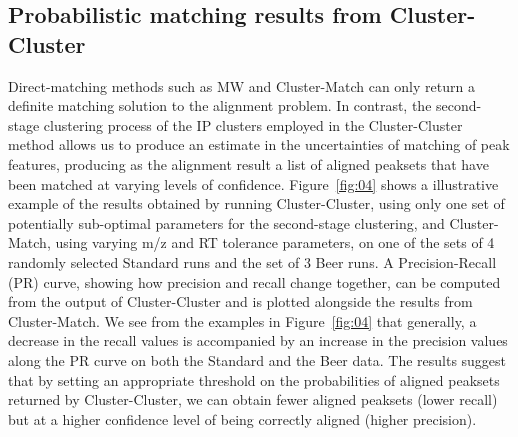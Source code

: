 
\subsection{Probabilistic matching results from Cluster-Cluster}

Direct-matching methods such as MW and Cluster-Match can only return a definite matching solution to the alignment problem. In contrast, the second-stage clustering process of the IP clusters employed in the Cluster-Cluster method allows us to produce an estimate in the uncertainties of matching of peak features, producing as the alignment result a list of aligned peaksets that have been matched at varying levels of confidence. Figure~\ref{fig:04} shows a illustrative example of the results obtained by running Cluster-Cluster, using only one set of potentially sub-optimal parameters for the second-stage clustering, and Cluster-Match, using varying m/z and RT tolerance parameters, on one of the sets of 4 randomly selected Standard runs and the set of 3 Beer runs. A Precision-Recall (PR) curve, showing how precision and recall change together, can be computed from the output of Cluster-Cluster and is plotted alongside the results from Cluster-Match. We see from the examples in Figure~\ref{fig:04} that generally, a decrease in the recall values is accompanied by an increase in the precision values along the PR curve on both the Standard and the Beer data. The results suggest that by setting an appropriate threshold on the probabilities of aligned peaksets returned by Cluster-Cluster, we can obtain fewer aligned peaksets (lower recall) but at a higher confidence level of being correctly aligned (higher precision).

